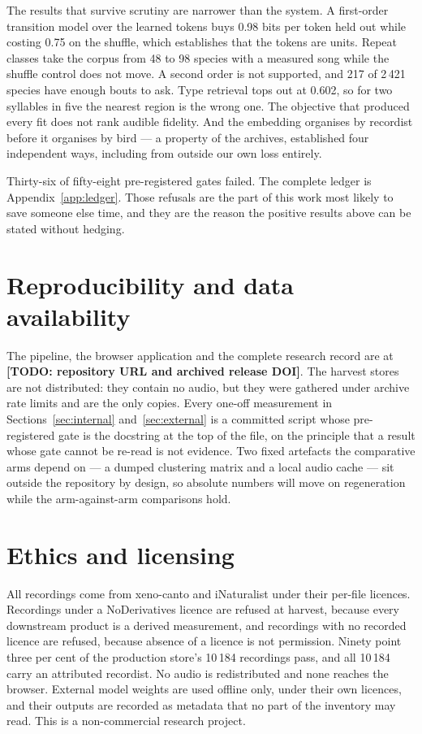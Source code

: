 \documentclass[10pt,twocolumn,a4paper]{article}
\newcommand{\todo}[1]{{\color{red}\textbf{[TODO: #1]}}}
\begin{document}
The results that survive scrutiny are narrower than the system. A first-order transition model
over the learned tokens buys 0.98 bits per token held out while costing 0.75 on the shuffle,
which establishes that the tokens are units. Repeat classes take the corpus from 48 to 98
species with a measured song while the shuffle control does not move. A second order is not
supported, and 217 of 2\,421 species have enough bouts to ask. Type retrieval tops out at
0.602, so for two syllables in five the nearest region is the wrong one. The objective that
produced every fit does not rank audible fidelity. And the embedding organises by recordist
before it organises by bird --- a property of the archives, established four independent ways,
including from outside our own loss entirely.

Thirty-six of fifty-eight pre-registered gates failed. The complete ledger is
Appendix~\ref{app:ledger}. Those refusals are the part of this work most likely to save
someone else time, and they are the reason the positive results above can be stated without
hedging.

\section*{Reproducibility and data availability}

The pipeline, the browser application and the complete research record are at
\todo{repository URL and archived release DOI}. The harvest stores are not distributed:
they contain no audio, but they were gathered under archive rate limits and are the only
copies. Every one-off measurement in Sections~\ref{sec:internal} and~\ref{sec:external} is a
committed script whose pre-registered gate is the docstring at the top of the file, on the
principle that a result whose gate cannot be re-read is not evidence. Two fixed artefacts the
comparative arms depend on --- a dumped clustering matrix and a local audio cache --- sit
outside the repository by design, so absolute numbers will move on regeneration while the
arm-against-arm comparisons hold.

\section*{Ethics and licensing}

All recordings come from xeno-canto and iNaturalist under their per-file licences. Recordings
under a NoDerivatives licence are refused at harvest, because every downstream product is a
derived measurement, and recordings with no recorded licence are refused, because absence of a
licence is not permission. Ninety point three per cent of the production store's 10\,184
recordings pass, and all 10\,184 carry an attributed recordist. No audio is redistributed and
none reaches the browser. External model weights are used offline only, under their own
licences, and their outputs are recorded as metadata that no part of the inventory may read.
This is a non-commercial research project.
\end{document}
